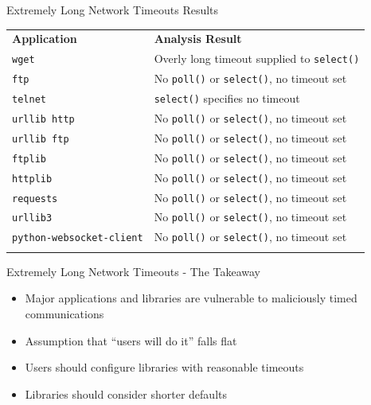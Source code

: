 \documentclass[pdf]{beamer}
\begin{document}
\begin{frame}{Extremely Long Network Timeouts Results}
\begin{table}[t]
  \scriptsize{}
  \begin{tabular}{l | l}
    \toprule{}
    {\bf Application}              & {\bf Analysis Result}\\
    {\tt wget}                     & Overly long timeout supplied to {\tt select()} \\
    {\tt ftp}                      & No {\tt poll()} or {\tt select()}, no timeout set \\
    {\tt telnet}                   & {\tt select()} specifies no timeout \\
    {\tt urllib http}              & No {\tt poll()} or {\tt select()}, no timeout set \\
    {\tt urllib ftp}               & No {\tt poll()} or {\tt select()}, no timeout set \\
    {\tt ftplib}                   & No {\tt poll()} or {\tt select()}, no timeout set \\
    {\tt httplib}                  & No {\tt poll()} or {\tt select()}, no timeout set \\
    {\tt requests}                 & No {\tt poll()} or {\tt select()}, no timeout set \\
    {\tt urllib3}                  & No {\tt poll()} or {\tt select()}, no timeout set \\
    {\tt python-websocket-client}  & No {\tt poll()} or {\tt select()}, no timeout set \\
    \bottomrule{}
  \end{tabular}
\end{table}
\end{frame}


\begin{frame}{Extremely Long Network Timeouts - The Takeaway}
  \begin{itemize}
    \item{Major applications and libraries are vulnerable to maliciously
      timed communications}
    \item{Assumption that ``users will do it'' falls flat}
    \item{Users should configure libraries with reasonable timeouts}
    \item{Libraries should consider shorter defaults}
  \end{itemize}
\end{frame}
\end{document}
